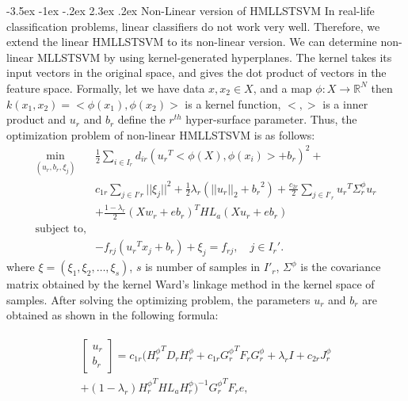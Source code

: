 \documentclass[12pt,a4paper,oneside,english]{report}
\makeatletter
\renewcommand\section{\@startsection {section}{1}{\z@}%
                                   {-3.5ex \@plus -1ex \@minus -.2ex}%
                                   {2.3ex \@plus.2ex}%
                                   {\centering\normalfont\LARGE\bfseries}}
\makeatother
\begin{document}
\section{Non-Linear version of HMLLSTSVM}
In real-life classification problems, linear classifiers do not work very well. Therefore, we extend the linear HMLLSTSVM to its non-linear version. We can determine non-linear MLLSTSVM by using kernel-generated hyperplanes. The kernel takes its input vectors in the original space, and gives the dot product of vectors in the feature space. Formally, let we have data $x, x_2 \in X$, and a map $\phi: X \rightarrow \mathbb{R}^N$ then  $k\left(x_1, x_2\right) = <\phi(x_1),\phi(x_2)>$ is a kernel function, $<,>$ is a inner product and $u_r$ and $b_r$ define the $r^{th}$ hyper-surface parameter. Thus, the optimization problem of non-linear HMLLSTSVM is as follows:
\begin{eqnarray}
 \min_{(u_r,b_r,\xi_j)}& \frac{1}{2}\sum_{i\in I_r}d_{ir}\left({u_r}^T<\phi(X),\phi(x_i)>  +b_r\right)^2 + \nonumber \\ &c_{1r}\sum_{j\in I'r}||\xi_j||^2 + \frac{1}{2}\lambda_r\left(||u_r||_2 + {b_r}^2\right) + \frac{c_{2r}}{2}\displaystyle\sum_{j\in I'_r} {u_r}^T{\Sigma}^{\phi}_r{u_r} \nonumber\\ & + \frac{1-\lambda_r}{2}\left(Xw_r + eb_r\right)^THL_a\left(Xu_r + eb_r\right)\nonumber\\
\mbox{subject to,} &\nonumber \\
 & -f_{rj}\left({u_r}^Tx_j + b_r\right) + \xi_j = f_{rj}, \quad j\in I_r'\label{qpp21}.
\end{eqnarray}
where $\xi=(\xi_1,\xi_2,\ldots, \xi_s)$, $s$ is number of samples in $I'_r$, $\Sigma^{\phi}$ is the covariance matrix obtained by the kernel Ward's linkage method in the kernel space of samples. After solving the optimizing problem, the parameters $u_r$ and $b_r$ are obtained as shown in the following formula:

\begin{eqnarray}
\begin{aligned}
\begin{bmatrix}
u_r \\
b_r
\end{bmatrix}
= c_{1r} \bigg( {H_r^{\phi}}^T D_r H_r^{\phi} + c_{1r} {G_r^{\phi}}^T F_r G_r^{\phi} + \lambda_r I + c_{2r} J_r^{\phi} \\
+ (1-\lambda_r) {H_r^{\phi}}^T HL_a H_r^{\phi} \bigg)^{-1} {G_r^{\phi}}^T F_r e,
\end{aligned}
\end{eqnarray}
\label{qpp22}
\end{document}
